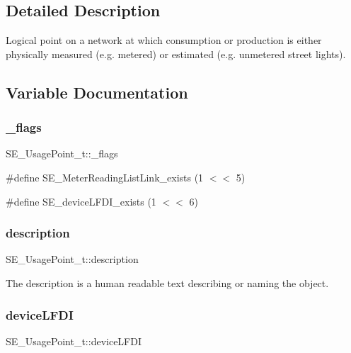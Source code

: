 \subsection{Detailed Description}
Logical point on a network at which consumption or production is either physically measured (e.\+g. metered) or estimated (e.\+g. unmetered street lights). 

\subsection{Variable Documentation}
\mbox{\label{group__UsagePoint_ga22a1651a84bc960921ca4bd34c078437}} 
\subsubsection{\texorpdfstring{\+\_\+flags}{\_flags}}
{\footnotesize\ttfamily S\+E\+\_\+\+Usage\+Point\+\_\+t\+::\+\_\+flags}

\#define S\+E\+\_\+\+Meter\+Reading\+List\+Link\+\_\+exists (1 $<$$<$ 5)

\#define S\+E\+\_\+device\+L\+F\+D\+I\+\_\+exists (1 $<$$<$ 6) \mbox{\label{group__UsagePoint_ga6ab8b16a8dde1f19d28423dc07615af8}} 
\subsubsection{\texorpdfstring{description}{description}}
{\footnotesize\ttfamily S\+E\+\_\+\+Usage\+Point\+\_\+t\+::description}

The description is a human readable text describing or naming the object. \mbox{\label{group__UsagePoint_gafb00c05d7c38ea87e94b837d5712ac0b}} 
\subsubsection{\texorpdfstring{device\+L\+F\+DI}{deviceLFDI}}
{\footnotesize\ttfamily S\+E\+\_\+\+Usage\+Point\+\_\+t\+::device\+L\+F\+DI}

